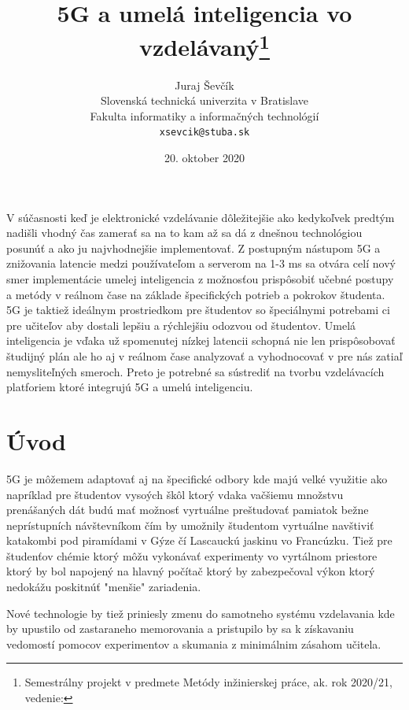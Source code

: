 \documentclass[10pt,oneside,slovak,a4paper]{article}
\title{5G a umelá inteligencia vo vzdelávaný\thanks{Semestrálny projekt v predmete Metódy inžinierskej práce, ak. rok 2020/21, vedenie:}}
\author{Juraj Ševčík\\[2pt]
	{\small Slovenská technická univerzita v Bratislave}\\
	{\small Fakulta informatiky a informačných technológií}\\
	{\small \texttt{xsevcik@stuba.sk}}
}
\date{\small 20. oktober 2020}
\begin{document}
\maketitle

\begin{abstract}


\end{abstract}
V súčasnosti  keď je elektronické vzdelávanie dôležitejšie ako kedykoľvek predtým nadišli vhodný čas zamerať sa na to kam až sa dá z dnešnou technológiou posunúť a ako ju najvhodnejšie implementovať. Z postupným nástupom 5G a znižovania latencie medzi používateľom a serverom na 1-3 ms sa otvára celí nový smer implementácie umelej inteligencia z možnosťou prispôsobiť učebné postupy a metódy v reálnom čase na základe špecifických potrieb a pokrokov študenta.  5G je taktiež ideálnym prostriedkom pre študentov so špeciálnymi potrebami ci pre učiteľov aby dostali lepšiu a rýchlejšiu odozvou od študentov.
Umelá inteligencia je vďaka už spomenutej nízkej latencii schopná nie len prispôsobovať študijný plán ale ho aj v reálnom čase analyzovať  a vyhodnocovať v pre nás zatiaľ nemysliteľných smeroch. Preto je potrebné sa sústrediť na tvorbu vzdelávacích platforiem ktoré integrujú 5G a umelú inteligenciu.

\newpage
\section{Úvod}



5G je môžemem adaptovať aj na špecifické odbory kde majú velké využitie ako napríklad pre študentov vysoých škôl ktorý vdaka vačšiemu množstvu prenášaných dát budú mať možnosť vyrtuálne preštudovať pamiatok bežne neprístupních návštevníkom čím by umožnily študentom vyrtuálne navštiviť katakombi pod piramídami v Gýze čí Lascauckú jaskinu vo Francúzku. Tiež pre študenťov chémie ktorý môžu vykonávať experimenty vo vyrtálnom priestore ktorý by bol napojený na hlavný počítač ktorý by zabezpečoval výkon ktorý nedokážu poskitnúť "menšie" zariadenia. 

Nové technologie by tiež priniesly zmenu do samotneho systému vzdelavania kde by upustilo od zastaraneho memorovania a pristupilo by sa k získavaniu vedomostí pomocov experimentov a skumania z minimálnim zásahom učitela.\cite{Opincariu2019EDUCATIONIT}
\end{document}
